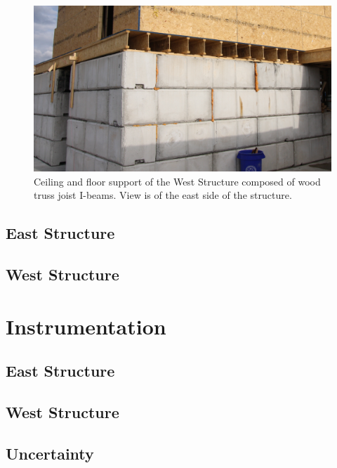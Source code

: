 \documentclass[12pt,oneside]{book}
\begin{document}
\begin{figure}[!ht]
\includegraphics[width=6in]{../../Hose_Stream_Report/Pictures/TJI_support}
\caption[TJI-constructed ceiling/floor support of the West Structure.]{Ceiling and floor support of the West Structure composed of wood truss joist I-beams. View is of the east side of the structure.}
\label{fig:TJI}
\end{figure}
\FloatBarrier

\subsection{East Structure}
\label{sec:East_descr}

\subsection{West Structure}
\label{sec:West_descr}

\section{Instrumentation}
\label{sec:Instrumentation}

\subsection{East Structure}
\label{sec:East_instrument}

\subsection{West Structure}
\label{sec:West_instruments}

\subsection{Uncertainty}
\label{sec:Uncertainty}
\end{document}
